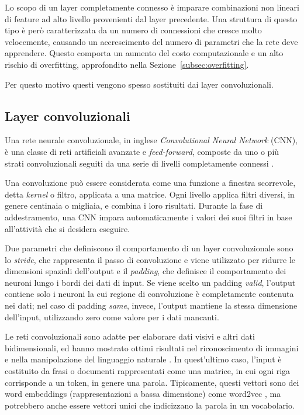 Lo scopo di un layer completamente connesso è imparare combinazioni non lineari di feature ad alto livello provenienti dal layer precedente. 
Una struttura di questo tipo è però caratterizzata da un numero di connessioni che cresce molto velocemente, causando un accrescimento del numero di parametri che la rete deve apprendere.
Questo comporta un aumento del costo computazionale e un alto rischio di overfitting, approfondito nella Sezione~\ref{subsec:overfitting}.

Per questo motivo questi vengono spesso sostituiti dai layer convoluzionali.

\subsection{Layer convoluzionali}
\label{subsec:cnn}
Una rete neurale convoluzionale, in inglese \emph{Convolutional Neural Network} (CNN), è una classe di reti artificiali avanzate e \emph{feed-forward}, composte da uno o più strati convoluzionali seguiti da una serie di livelli completamente connessi \cite{kim2014convolutional}.

Una convoluzione può essere considerata come una funzione a finestra scorrevole, detta \emph{kernel} o filtro, applicata a una matrice. 
Ogni livello applica filtri diversi, in genere centinaia o migliaia, e combina i loro risultati. 
Durante la fase di addestramento, una CNN impara automaticamente i valori dei suoi filtri in base all'attività che si desidera eseguire. 


Due parametri che definiscono il comportamento di un layer convoluzionale sono lo \emph{stride}, che rappresenta il passo di 
convoluzione e viene utilizzato per ridurre le dimensioni spaziali dell'output e il \emph{padding}, che definisce il comportamento dei neuroni lungo 
i bordi dei dati di input. Se viene scelto un padding \emph{valid}, l'output contiene solo i neuroni la cui regione di convoluzione è completamente contenuta nei dati; nel caso di padding \emph{same}, invece, l'output mantiene la stessa dimensione dell'input, utilizzando zero come valore per i dati mancanti.

Le reti convoluzionali sono adatte per elaborare dati visivi e altri dati bidimensionali, ed hanno mostrato ottimi risultati nel riconoscimento di immagini e nella manipolazione del linguaggio naturale \cite{manning1999foundations}.
In quest'ultimo caso, l'input è costituito da frasi o documenti rappresentati come una matrice, in cui ogni riga corrisponde a un token, in genere una parola. Tipicamente, questi vettori sono dei word embeddings (rappresentazioni a bassa dimensione) come word2vec \cite{mikolov2013distributed}, ma potrebbero anche essere vettori unici che indicizzano la parola in un vocabolario. 

